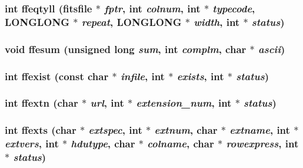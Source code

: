 \subsubsection{\setlength{\rightskip}{0pt plus 5cm}int ffeqtyll (\bf{fitsfile} $\ast$ {\em fptr}, int {\em colnum}, int $\ast$ {\em typecode}, \bf{LONGLONG} $\ast$ {\em repeat}, \bf{LONGLONG} $\ast$ {\em width}, int $\ast$ {\em status})}\label{src_2fitsio_8h_4770ce4bf3ee1d8e8fe470d8cb0f33a2}


\subsubsection{\setlength{\rightskip}{0pt plus 5cm}void ffesum (unsigned long {\em sum}, int {\em complm}, char $\ast$ {\em ascii})}\label{src_2fitsio_8h_096fd5df7ef2a55a0e548744a8c93be3}


\subsubsection{\setlength{\rightskip}{0pt plus 5cm}int ffexist (const char $\ast$ {\em infile}, int $\ast$ {\em exists}, int $\ast$ {\em status})}\label{src_2fitsio_8h_a43845de368eac56f4640bb78d54fe12}


\subsubsection{\setlength{\rightskip}{0pt plus 5cm}int ffextn (char $\ast$ {\em url}, int $\ast$ {\em extension\_\-num}, int $\ast$ {\em status})}\label{src_2fitsio_8h_9dcef60f99afddb050fbcd03fa2c97d9}


\subsubsection{\setlength{\rightskip}{0pt plus 5cm}int ffexts (char $\ast$ {\em extspec}, int $\ast$ {\em extnum}, char $\ast$ {\em extname}, int $\ast$ {\em extvers}, int $\ast$ {\em hdutype}, char $\ast$ {\em colname}, char $\ast$ {\em rowexpress}, int $\ast$ {\em status})}\label{src_2fitsio_8h_17f7be49ef6df7e06048b3c9a23d4fd4}


